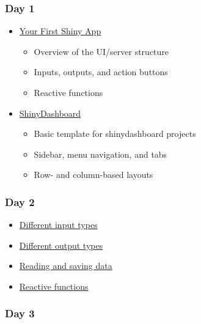 \documentclass[
]{book}
\providecommand{\tightlist}{%
  \setlength{\itemsep}{0pt}\setlength{\parskip}{0pt}}
\begin{document}
\hypertarget{day-1}{%
\subsubsection{Day 1}\label{day-1}}

\begin{itemize}
\tightlist
\item
  \protect\hyperlink{first-app}{Your First Shiny App}

  \begin{itemize}
  \tightlist
  \item
    Overview of the UI/server structure
  \item
    Inputs, outputs, and action buttons
  \item
    Reactive functions
  \end{itemize}
\item
  \protect\hyperlink{shinydashboard}{ShinyDashboard}

  \begin{itemize}
  \tightlist
  \item
    Basic template for shinydashboard projects
  \item
    Sidebar, menu navigation, and tabs
  \item
    Row- and column-based layouts
  \end{itemize}
\end{itemize}

\hypertarget{day-2}{%
\subsubsection{Day 2}\label{day-2}}

\begin{itemize}
\tightlist
\item
  \protect\hyperlink{inputs}{Different input types}
\item
  \protect\hyperlink{outputs}{Different output types}
\item
  \protect\hyperlink{data}{Reading and saving data}
\item
  \protect\hyperlink{reactives}{Reactive functions}
\end{itemize}

\hypertarget{day-3}{%
\subsubsection{Day 3}\label{day-3}}
\end{document}
